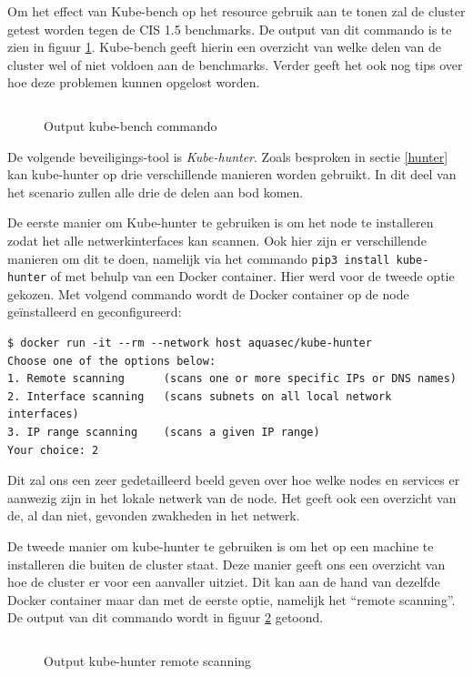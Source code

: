 Om het effect van Kube-bench op het resource gebruik aan te tonen zal de cluster getest worden tegen de CIS 1.5 benchmarks. De output van dit commando is te zien in figuur \ref{benchOut}. Kube-bench geeft hierin een overzicht van welke delen van de cluster wel of niet voldoen aan de benchmarks. Verder geeft het ook nog tips over hoe deze problemen kunnen opgelost worden.

\begin{figure}[h] 
	\centering
	\inputminted[fontsize=\footnotesize,linenos]{bash}{files/benchOutput.txt}
	\caption{Output kube-bench commando}
	\label{benchOut}
\end{figure}

De volgende beveiligings-tool is \textit{Kube-hunter}. Zoals besproken in sectie \ref{hunter} kan kube-hunter op drie verschillende manieren worden gebruikt. In dit deel van het scenario zullen alle drie de delen aan bod komen.

De eerste manier om Kube-hunter te gebruiken is om het node te installeren zodat het alle netwerkinterfaces kan scannen. Ook hier zijn er verschillende manieren om dit te doen, namelijk via het commando \verb|pip3 install kube-hunter| of met behulp van een Docker container. Hier werd voor de tweede optie gekozen. Met volgend commando wordt de Docker container op de node geïnstalleerd en geconfigureerd:
\begin{verbatim} 
$ docker run -it --rm --network host aquasec/kube-hunter
Choose one of the options below:
1. Remote scanning      (scans one or more specific IPs or DNS names)
2. Interface scanning   (scans subnets on all local network interfaces)
3. IP range scanning    (scans a given IP range)
Your choice: 2
\end{verbatim}
Dit zal ons een zeer gedetailleerd beeld geven over hoe welke nodes en services er aanwezig zijn in het lokale netwerk van de node. Het geeft ook een overzicht van de, al dan niet, gevonden zwakheden in het netwerk.

De tweede manier om kube-hunter te gebruiken is om het op een machine te installeren die buiten de cluster staat. Deze manier geeft ons een overzicht van hoe de cluster er voor een aanvaller uitziet. Dit kan aan de hand van dezelfde Docker container maar dan met de eerste optie, namelijk het ``remote scanning''. De output van dit commando wordt in figuur \ref{remoteHunt} getoond.

\begin{figure}[h] 
	\centering
	\inputminted[fontsize=\footnotesize,linenos]{bash}{files/hunterRemoteOutput.txt}
	\caption{Output kube-hunter remote scanning}
	\label{remoteHunt}
\end{figure}


